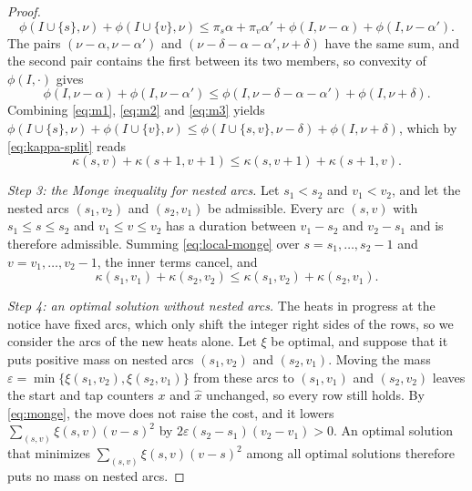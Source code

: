 \documentclass[11pt]{article}
\begin{document}
\begin{proof}
\begin{equation}\label{eq:m2}
\phi(I\cup\{s\},\nu)+\phi(I\cup\{v\},\nu)\le\pi_s\alpha+\pi_v\alpha'+\phi(I,\nu-\alpha)+\phi(I,\nu-\alpha').
\end{equation}
The pairs $(\nu-\alpha,\nu-\alpha')$ and $(\nu-\delta-\alpha-\alpha',\nu+\delta)$ have the same sum, and the second
pair contains the first between its two members, so convexity of $\phi(I,\cdot)$ gives
\begin{equation}\label{eq:m3}
\phi(I,\nu-\alpha)+\phi(I,\nu-\alpha')\le\phi(I,\nu-\delta-\alpha-\alpha')+\phi(I,\nu+\delta).
\end{equation}
Combining \eqref{eq:m1}, \eqref{eq:m2} and \eqref{eq:m3} yields
$\phi(I\cup\{s\},\nu)+\phi(I\cup\{v\},\nu)\le\phi(I\cup\{s,v\},\nu-\delta)+\phi(I,\nu+\delta)$, which by
\eqref{eq:kappa-split} reads
\begin{equation}\label{eq:local-monge}
\kappa(s,v)+\kappa(s+1,v+1)\le\kappa(s,v+1)+\kappa(s+1,v).
\end{equation}

\emph{Step 3: the Monge inequality for nested arcs.} Let $s_1<s_2$ and $v_1<v_2$, and let the nested arcs $(s_1,v_2)$
and $(s_2,v_1)$ be admissible. Every arc $(s,v)$ with $s_1\le s\le s_2$ and $v_1\le v\le v_2$ has a duration between
$v_1-s_2$ and $v_2-s_1$ and is therefore admissible. Summing \eqref{eq:local-monge} over $s=s_1,\dots,s_2-1$ and
$v=v_1,\dots,v_2-1$, the inner terms cancel, and
\begin{equation}\label{eq:monge}
\kappa(s_1,v_1)+\kappa(s_2,v_2)\le\kappa(s_1,v_2)+\kappa(s_2,v_1).
\end{equation}

\emph{Step 4: an optimal solution without nested arcs.} The heats in progress at the notice have fixed arcs, which only
shift the integer right sides of the rows, so we consider the arcs of the new heats alone. Let $\xi$ be optimal, and
suppose that it puts positive mass on nested arcs $(s_1,v_2)$ and $(s_2,v_1)$. Moving the mass
$\varepsilon=\min\{\xi(s_1,v_2),\xi(s_2,v_1)\}$ from these arcs to $(s_1,v_1)$ and $(s_2,v_2)$ leaves the start and tap
counters $x$ and $\hat x$ unchanged, so every row still holds. By \eqref{eq:monge}, the move does not raise the cost,
and it lowers $\sum_{(s,v)}\xi(s,v)(v-s)^2$ by $2\varepsilon(s_2-s_1)(v_2-v_1)>0$. An optimal solution that minimizes
$\sum_{(s,v)}\xi(s,v)(v-s)^2$ among all optimal solutions therefore puts no mass on nested arcs.


\end{proof}
\end{document}
